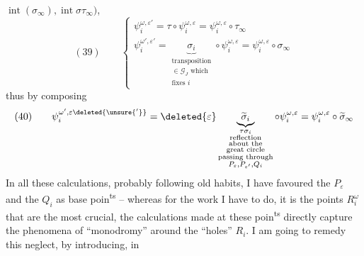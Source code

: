 $\operatorname{int}(\sigma_\infty),\operatorname{int}\sigma\tau_\infty)$,
\[
(39)\qquad\begin{cases}
\psi_i^{\omega,\varepsilon'}=\tau\circ\psi_i^{\omega,\varepsilon}=\psi_i^{\omega,\varepsilon}\circ\tau_\infty\\[5pt]
\psi_i^{\omega',\varepsilon'}=\underbrace{\sigma_i}_{\substack{\text{transposition}\\\in\mathcal G_J\text{ which}\\\text{fixes }i}}\circ\psi_i^{\omega,\varepsilon}=\psi_i^{\omega,\varepsilon}\circ\sigma_\infty
\end{cases}
\]
thus by composing
\[
(40)\qquad\psi_i^{\omega',\varepsilon\deleted{\unsure{'}}}=\deleted{\varepsilon}\underbrace{\widetilde\sigma_i}_{\substack{\tau\sigma_i\\\text{reflection}\\\text{about the}\\\text{great circle}\\\text{passing through}\\P_\varepsilon,P_{\varepsilon'},Q_i}}\circ\psi_i^{\omega,\varepsilon}=\psi_i^{\omega,\varepsilon}\circ\widetilde\sigma_\infty
\]
In all these calculations, probably following old habits, I have favoured the $P_\varepsilon$ and the $Q_i$ as base poin\textsuperscript{ts} -- whereas for the work I have to do, it is the points $R_i^\omega$ that are the most crucial,  the calculations made at these poin\textsuperscript{ts} directly capture the phenomena of ``monodromy'' around the ``holes'' $R_i$. I am going to remedy this neglect, by introducing, in
